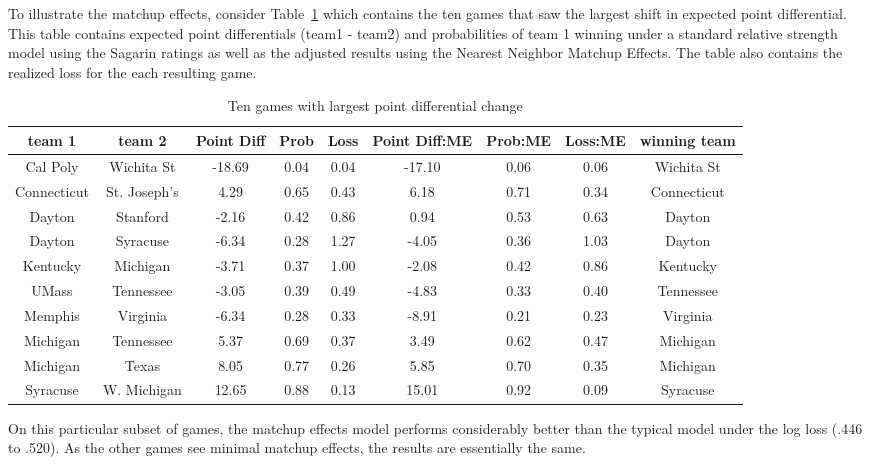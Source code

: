 To illustrate the matchup effects, consider Table~\ref{tab:change} which contains the ten games that saw the largest shift in expected point differential.  This table contains expected point differentials (team1 - team2) and probabilities of team 1 winning under a standard relative strength model using the Sagarin ratings as well as the adjusted results using the Nearest Neighbor Matchup Effects.  The table also contains the realized loss for the each resulting game.
\begin{table}[h!]
\caption{Ten games with largest point differential change}
\footnotesize
\centering
\begin{tabular}{|cc | ccc | ccc | c|}
  \hline
  \hline
 team 1 & team 2 & Point Diff & Prob & Loss & Point Diff:ME & Prob:ME & Loss:ME & winning team \\ 
  \hline
 Cal Poly & Wichita St & -18.69 & 0.04 & 0.04 & -17.10 & 0.06 & 0.06 & Wichita St \\ 
 Connecticut & St. Joseph's &4.29 & 0.65 & 0.43 & 6.18 & 0.71 & 0.34 & Connecticut \\ 
 Dayton & Stanford & -2.16 & 0.42 & 0.86 & 0.94 & 0.53 & 0.63 & Dayton \\ 
 Dayton & Syracuse & -6.34 & 0.28 & 1.27 & -4.05 & 0.36 & 1.03 & Dayton \\ 
 Kentucky & Michigan & -3.71 & 0.37 & 1.00 & -2.08 & 0.42 & 0.86 & Kentucky \\ 
 UMass & Tennessee &-3.05 & 0.39 & 0.49 & -4.83 & 0.33 & 0.40 & Tennessee \\ 
 Memphis & Virginia & -6.34 & 0.28 & 0.33 & -8.91 & 0.21 & 0.23 & Virginia  \\ 
 Michigan & Tennessee & 5.37 & 0.69 & 0.37 & 3.49 & 0.62 & 0.47 & Michigan\\ 
 Michigan & Texas & 8.05 & 0.77 & 0.26 & 5.85 & 0.70 & 0.35 & Michigan \\ 
 Syracuse & W. Michigan & 12.65 & 0.88 & 0.13 & 15.01 & 0.92 & 0.09 & Syracuse \\ 
   \hline
   \hline
\end{tabular}
\label{tab:change}
\end{table}
On this particular subset of games, the matchup effects model performs considerably better than the typical model under the log loss (.446 to .520).  As the other games see minimal matchup effects, the results are essentially the same.  